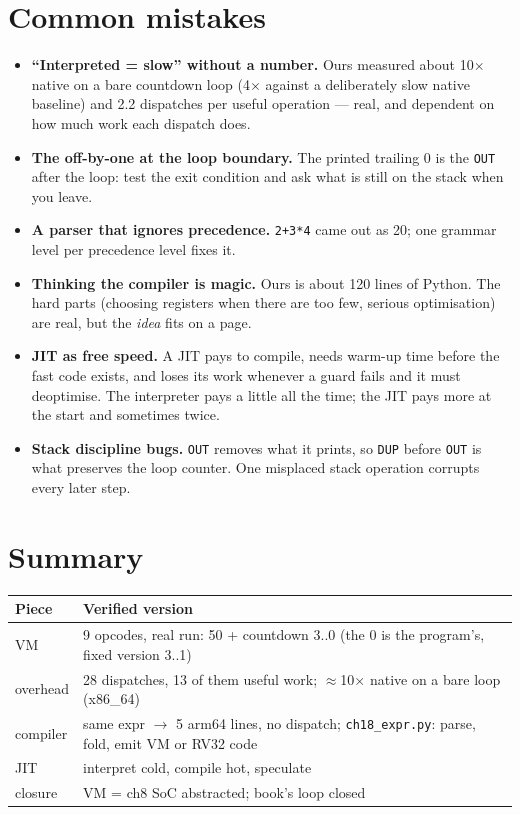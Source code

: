 \section{Common mistakes}
\begin{itemize}
\item \textbf{``Interpreted = slow'' without a number.} Ours
      measured about 10$\times$ native on a bare countdown loop
      (4$\times$ against a deliberately slow native baseline) and 2.2
      dispatches per useful operation --- real, and dependent on how
      much work each dispatch does.
\item \textbf{The off-by-one at the loop boundary.} The printed
      trailing 0 is the \texttt{OUT} after the loop: test the exit
      condition and ask what is still on the stack when you leave.
\item \textbf{A parser that ignores precedence.} \texttt{2+3*4}
      came out as 20; one grammar level per precedence level fixes it.
\item \textbf{Thinking the compiler is magic.} Ours is about 120
      lines of Python. The hard parts (choosing registers when there are
      too few, serious optimisation) are real, but the \emph{idea} fits
      on a page.
\item \textbf{JIT as free speed.} A JIT pays to compile, needs warm-up
      time before the fast code exists, and loses its work whenever a
      guard fails and it must deoptimise. The interpreter pays a little all
      the time; the JIT pays more at the start and sometimes twice.
\item \textbf{Stack discipline bugs.} \texttt{OUT} removes what it
      prints, so \texttt{DUP} before \texttt{OUT} is what preserves the
      loop counter. One misplaced stack operation corrupts every later step.
\end{itemize}

\section{Summary}
\begin{tabularx}{\linewidth}{@{}l X@{}}
\toprule
\textbf{Piece} & \textbf{Verified version} \\
\midrule
VM       & 9 opcodes, real run: 50 + countdown 3..0 (the 0 is the program's, fixed version 3..1) \\
overhead & 28 dispatches, 13 of them useful work; $\approx$10$\times$ native on a bare loop (x86\_64) \\
compiler & same expr $\to$ 5 arm64 lines, no dispatch; \texttt{ch18\_expr.py}: parse, fold, emit VM or RV32 code \\
JIT      & interpret cold, compile hot, speculate \\
closure  & VM = ch8 SoC abstracted; book's loop closed \\
\bottomrule
\end{tabularx}

